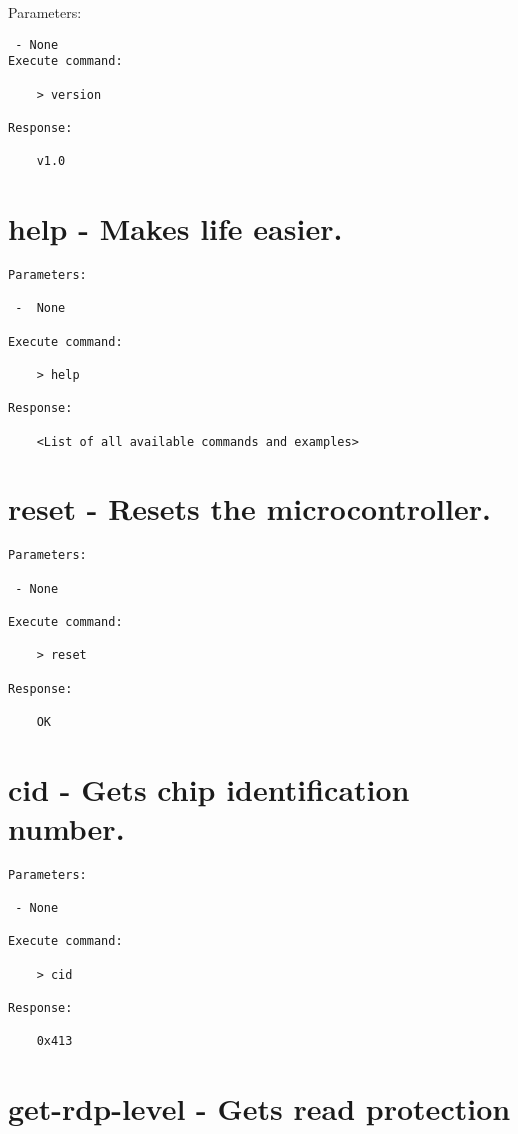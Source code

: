 Parameters:
\begin{lstlisting}
 - None
Execute command: 

    > version  
    
Response: 

    v1.0  
\end{lstlisting}
    
    
\section{help - Makes life easier.}
\label{bl_cmd:help}

\begin{lstlisting}
Parameters:

 -  None

Execute command: 

    > help  
    
Response: 

    <List of all available commands and examples>
\end{lstlisting}

\section{reset - Resets the microcontroller.}
\label{bl_cmd:reset}

\begin{lstlisting}
Parameters:

 - None

Execute command: 

    > reset
    
Response: 

    OK
\end{lstlisting}


\section{cid - Gets chip identification number.}
\label{bl_cmd:cid}

\begin{lstlisting}
Parameters:

 - None

Execute command: 

    > cid  
    
Response: 

    0x413
\end{lstlisting}

\section{get-rdp-level - Gets read protection \texorpdfstring{\protect\cite[p.~93]{stm32f407_ref_man}}{}}
\label{bl_cmd:get-rdp-level}

